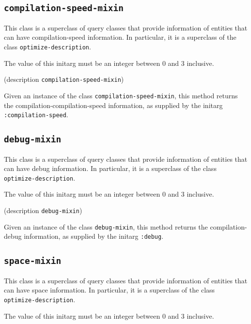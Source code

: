 \subsection{\texttt{compilation-speed-mixin}}
\label{sec-compilation-speed-mixin}

This class is a superclass of query classes that provide information
of entities that can have compilation-speed information.  In particular, it is a
superclass of the class \texttt{optimize-description}.


The value of this initarg must be an integer between $0$ and $3$
inclusive.

 {(description {\tt compilation-speed-mixin})}

Given an instance of the class \texttt{compilation-speed-mixin}, this method
returns the compilation-compilation-speed information, as supplied by the initarg
\texttt{:compilation-speed}.

\subsection{\texttt{debug-mixin}}
\label{sec-debug-mixin}

This class is a superclass of query classes that provide information
of entities that can have debug information.  In particular, it is a
superclass of the class \texttt{optimize-description}.


The value of this initarg must be an integer between $0$ and $3$
inclusive.

 {(description {\tt debug-mixin})}

Given an instance of the class \texttt{debug-mixin}, this method
returns the compilation-debug information, as supplied by the initarg
\texttt{:debug}.

\subsection{\texttt{space-mixin}}
\label{sec-space-mixin}

This class is a superclass of query classes that provide information
of entities that can have space information.  In particular, it is a
superclass of the class \texttt{optimize-description}.


The value of this initarg must be an integer between $0$ and $3$
inclusive.

